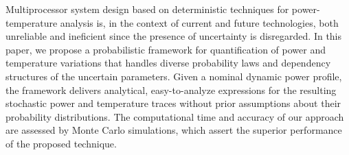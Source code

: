 Multiprocessor system design based on deterministic techniques for power-temperature analysis is, in the context of current and future technologies, both unreliable and ineficient since the presence of uncertainty is disregarded. In this paper, we propose a probabilistic framework for quantification of power and temperature variations that handles diverse probability laws and dependency structures of the uncertain parameters. Given a nominal dynamic power profile, the framework delivers analytical, easy-to-analyze expressions for the resulting stochastic power and temperature traces without prior assumptions about their probability distributions. The computational time and accuracy of our approach are assessed by Monte Carlo simulations, which assert the superior performance of the proposed technique.
